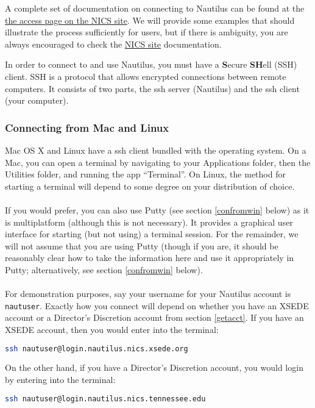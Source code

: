 A complete set of documentation on connecting to Nautilus can be found at the \href{http://www.nics.tennessee.edu/getting-started/access}{the access page on the NICS site}.  We will provide some examples that should illustrate the process sufficiently for users, but if there is ambiguity, you are always encouraged to check the \href{http://www.nics.tennessee.edu}{NICS site} documentation.

In order to connect to and use Nautilus, you must have a \textbf{S}ecure \textbf{SH}ell (SSH) client.  SSH is a protocol that allows encrypted connections between remote computers.  It consists of two parts, the ssh server (Nautilus) and the ssh client (your computer).

\subsubsection{Connecting from Mac and Linux}\label{confml}
Mac OS X and Linux have a ssh client bundled with the operating system.  On a Mac, you can open a terminal by navigating to your Applications folder, then the Utilities folder, and running the app ``Terminal''.  On Linux, the method for starting a terminal will depend to some degree on your distribution of choice.\\\\
%
If you would prefer, you can also use Putty (see section \ref{confromwin} below) as it is multiplatform (although this is not necessary).  It provides a graphical user interface for starting (but not using) a terminal session.  For the remainder, we will not assume that you are using Putty (though if you are, it should be reasonably clear how to take the information here and use it appropriately in Putty; alternatively, see section \ref{confromwin} below).\\\\
%
For demonstration purposes, say your username for your Nautilus account is \texttt{nautuser}.  Exactly how you connect will depend on whether you have an XSEDE account or a Director's Discretion account from section \ref{getacct}.  If you have an XSEDE account, then you would enter into the terminal:
\begin{lstlisting}[language=sh]
ssh nautuser@login.nautilus.nics.xsede.org
\end{lstlisting}%
On the other hand, if you have a Director's Discretion account, you would login by entering into the terminal:
\begin{lstlisting}[language=sh]
ssh nautuser@login.nautilus.nics.tennessee.edu
\end{lstlisting}%

